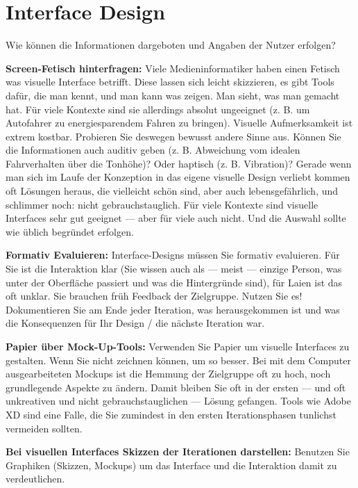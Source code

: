 \documentclass[11pt,a4paper,english]{scrreprt}
\newenvironment{comment}
  {\par\medskip
   \begingroup\color{olive}%
   }
 {\endgroup
  \medskip}
\begin{document}
\section{Interface Design}
\begin{comment}
Wie können die Informationen dargeboten und Angaben der Nutzer erfolgen?

\textbf{Screen-Fetisch hinterfragen:} Viele Medieninformatiker haben einen Fetisch was visuelle Interface betrifft. Diese lassen sich leicht skizzieren, es gibt Tools dafür, die man kennt, und man kann was zeigen. Man sieht, was man gemacht hat. Für viele Kontexte sind sie allerdings absolut ungeeignet (z. B. um Autofahrer zu energiesparendem Fahren zu bringen). Visuelle Aufmerksamkeit ist extrem kostbar. Probieren Sie deswegen bewusst andere Sinne aus. Können Sie die Informationen auch auditiv geben (z. B. Abweichung vom idealen Fahrverhalten über die Tonhöhe)? Oder haptisch (z. B. Vibration)? Gerade wenn man sich im Laufe der Konzeption in das eigene visuelle Design verliebt kommen oft Lösungen heraus, die vielleicht schön sind, aber auch lebensgefährlich, und schlimmer noch: nicht gebrauchstauglich. Für viele Kontexte sind visuelle Interfaces sehr gut geeignet — aber für viele auch nicht. Und die Auswahl sollte wie üblich begründet erfolgen.

\textbf{Formativ Evaluieren:} Interface-Designs müssen Sie formativ evaluieren. Für Sie ist die Interaktion klar (Sie wissen auch als — meist — einzige Person, was unter der Oberfläche passiert und was die Hintergründe sind), für Laien ist das oft unklar. Sie brauchen früh Feedback der Zielgruppe. Nutzen Sie es! Dokumentieren Sie am Ende jeder Iteration, was herausgekommen ist und was die Konsequenzen für Ihr Design / die nächste Iteration war.

\textbf{Papier über Mock-Up-Tools:} Verwenden Sie Papier um visuelle Interfaces zu gestalten. Wenn Sie nicht zeichnen können, um so besser. Bei mit dem Computer ausgearbeiteten Mockups ist die Hemmung der Zielgruppe oft zu hoch, noch grundlegende Aspekte zu ändern. Damit bleiben Sie oft in der ersten — und oft unkreativen und nicht gebrauchstauglichen — Lösung gefangen. Tools wie Adobe XD sind eine Falle, die Sie zumindest in den ersten Iterationsphasen tunlichst vermeiden sollten.

\textbf{Bei visuellen Interfaces Skizzen der Iterationen darstellen:} Benutzen Sie Graphiken (Skizzen, Mockups) um das Interface und die Interaktion damit zu verdeutlichen.
\end{comment}
\end{document}
